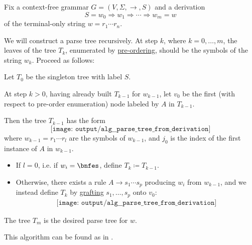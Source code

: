 \begin{algorithm}\label{alg:derivation_to_parse_tree}
  Fix a context-free grammar \( G = (V, \Sigma, \to, S) \) and a derivation
  \begin{equation*}
    S = w_0 \Rightarrow w_1 \Rightarrow \cdots \Rightarrow w_m = w
  \end{equation*}
  of the terminal-only string \( w = r_1 \cdots r_n \).

  We will construct a parse tree recursively. At step \( k \), where \( k = 0, \ldots, m \), the leaves of the tree \( T_k \), enumerated by \hyperref[def:ordered_tree_enumeration]{pre-ordering}, should be the symbols of the string \( w_k \). Proceed as follows:
  \begin{thmenum}
     Let \( T_0 \) be the singleton tree with label \( S \).

     At step \( k > 0 \), having already built \( T_{k-1} \) for \( w_{k-1} \), let \( v_0 \) be the first (with respect to pre-order enumeration) node labeled by \( A \) in \( T_{k-1} \).

    Then the tree \( T_{k-1} \) has the form
    \begin{equation*}
      \texttt{[image: output/alg\_\_parse\_tree\_from\_derivation]}
    \end{equation*}
    where \( w_{k-1} = r_1 \cdots r_l \) are the symbols of \( w_{k-1} \), and \( j_0 \) is the index of the first instance of \( A \) in \( w_{k-1} \).

    \begin{itemize}
      \item If \( l = 0 \), i.e. if \( w_i = \bnfes \), define \( T_k \coloneqq T_{k-1} \).

      \item Otherwise, there exists a rule \( A \to s_1 \cdots s_p \) producing \( w_i \) from \( w_{k-1} \), and we instead define \( T_k \) by \hyperref[def:ordered_tree_grafting]{grafting} \( s_1, \ldots, s_p \) onto \( v_0 \):
      \begin{equation*}
        \begin{aligned}
          \texttt{[image: output/alg\_\_parse\_tree\_from\_derivation]}
        \end{aligned}
      \end{equation*}
    \end{itemize}
  \end{thmenum}

   The tree \( T_m \) is the desired parse tree for \( w \).
\end{algorithm}
\begin{comments}
  \item This algorithm can be found as  in \cite{notebook:code}.
\end{comments}


